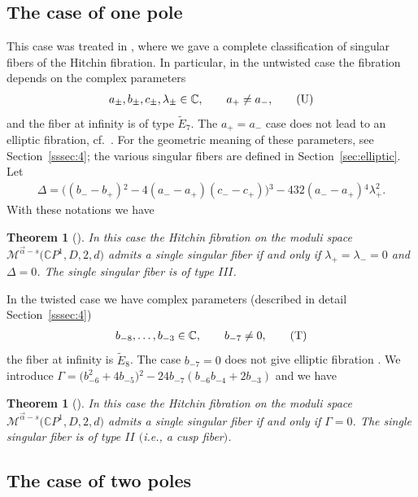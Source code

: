 \documentclass[pdftex]{sigma}
\newcommand{\C}{{\mathbb C}} %
\newcommand{\CP}[1]{\mathbb{C}P^{#1}} %
\newcommand{\Et}[1]{\widetilde{E}_{#1}} %
\newcommand{\Mod}{{\mathcal M}} %
\numberwithin{equation}{section}
\newtheorem{thm}[prop]{Theorem}
\begin{document}
\subsection{The case of one pole}\label{ss:OnePole}
This case was treated in \cite{ISS}, where we gave a complete
classification of singular fibers of the Hitchin fibration.
In particular, in the untwisted case the fibration depends on
the complex parameters
\begin{gather}\label{eq:untwisted-parameters}
 a_{\pm}, b_{\pm}, c_{\pm}, \lambda_{\pm} \in \C ,\qquad a_+ \neq a_- ,\tag{{U}}
 \end{gather}
and the fiber at infinity is of type $\Et7$. {The $a_+ = a_-$ case does
not lead to an elliptic fibration, cf.~\cite[Lemma~5.6]{ISS2}.}
For the geometric meaning of these parameters, see Section~\ref{sssec:4};
the various singular fibers are defined in Section~\ref{sec:elliptic}.
Let
\begin{gather*} \Delta = \big((b_--b_+){}^2-4 (a_--a_+) (c_--c_+)\big){}^3-432 (a_--a_+){}^4 \lambda _+^2.\end{gather*}
With these notations we have
\begin{thm}[{\cite[Theorem~1.1]{ISS}}]\label{thm:OnePoleUntwisted}
In this case the Hitchin fibration on the moduli space $\Mod ^{\vec{\alpha}-s}{\big(\CP1, D, 2, d\big)}$ admits a single singular fiber if
and only if $\lambda _+=\lambda _-=0$ and $\Delta =0$. The single singular fiber is of type $III$.
\end{thm}

In the twisted case we have complex parameters (described in detail Section~\ref{sssec:4})
\begin{gather}\label{eq:twisted-parameters}
 b_{-8},\ldots ,b_{-3} \in \C ,\qquad b_{-7} \neq 0, \tag{{T}}
 \end{gather}
the fiber at infinity is $\Et8$. The case $b_{-7} = 0$ does not give elliptic fibration \cite[Section~2.3.2]{ISS}.
We introduce
${\Gamma}=\big(b_{-6}^2+4 b_{-5}\big){}^2-24 b_{-7} (b_{-6} b_{-4}+2 b_{-3})$ and we have
\begin{thm}[{\cite[Theorem~1.3]{ISS}}]\label{thm:OnePoleTwisted}
In this case the Hitchin fibration on the moduli space $\Mod
^{\vec{\alpha}-s}{\big(\CP1, D, 2, d\big)}$ admits a single singular fiber
if and only if ${\Gamma} =0$. The single singular fiber is of
type $II$ $($i.e., a cusp fiber$)$.
\end{thm}

\subsection{The case of two poles}\label{ss:TwoPoles}
\end{document}
